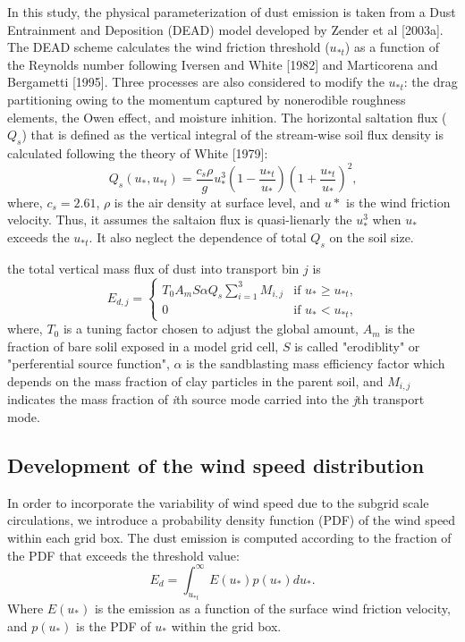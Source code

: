   In this study, the physical parameterization of dust emission is taken from a Dust 
  Entrainment and Deposition (DEAD) model developed by Zender et al [2003a]. The DEAD scheme
  calculates the wind friction threshold ($u_{*t}$) as a function of the Reynolds number 
  following Iversen and White [1982] and Marticorena and Bergametti [1995]. Three processes 
  are also considered to modify the $u_{*t}$: the drag partitioning owing to the momentum 
  captured by nonerodible roughness elements, the Owen effect, and moisture inhition. The 
  horizontal saltation flux ($Q_s$) that is defined as the vertical integral of the 
  stream-wise soil flux density is calculated following the theory of White [1979]:
  \begin{equation}
  Q_s(u_*,u_{*t}) = \frac{c_s \rho}{g} u_*^3
        \left(1-\frac{u_{*t}}{u_*}\right)
        \left(1+\frac{u_{*t}}{u_*}\right)^2 \mbox{,}
  \end{equation}
  where, $c_s=2.61$, $\rho$ is the air density at surface level, and $u*$ is the wind 
  friction velocity. Thus, it assumes the saltaion flux is quasi-lienarly the $u_*^3$ when
  $u_*$ exceeds the $u_{*t}$. It also neglect the dependence of total $Q_s$ on the soil size. 

  the total
   vertical mass flux of dust into transport bin $j$ is
   \begin{equation} \label{eq:Ed}
   E_{d,j} = 
     \begin{cases} T_0 A_m S \alpha Q_s
                   \displaystyle \sum_{i=1}^3 M_{i,j} & \mbox{if $u_* \geq u_{*t}$,} \\
                   0 & \mbox{if $u_* < u_{*t}$,}
     \end{cases}
   \end{equation}
   where, $T_0$ is a tuning factor chosen to adjust the global amount, $A_m$ is the fraction
   of bare solil exposed in a model grid cell, $S$ is called "erodiblity" or "perferential 
   source function", $\alpha$ is the sandblasting mass efficiency factor which depends on the
   mass fraction of clay particles in the parent soil, and $M_{i,j}$ indicates the mass 
   fraction of \textit{i}th source mode carried into the \textit{j}th transport mode.

\subsection{Development of the wind speed distribution}

  In order to incorporate the variability of wind speed due to the subgrid scale
  circulations, we introduce a probability density function (PDF) of the wind speed
  within each grid box. The dust emission is computed according to the fraction of 
  the PDF that exceeds the threshold value:
  \begin{equation}
  E_{d} = \int^\infty_{u_{*t}} E(u_*) p(u_*) d u_* \mbox{.}
  \end{equation}
  Where $E(u_*)$ is the emission as a function of the surface wind friction velocity,
  and $p(u_*)$ is the PDF of $u_*$ within the grid box. 


